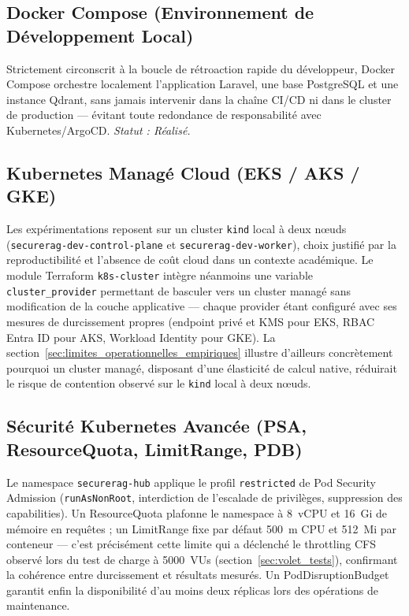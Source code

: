 \subsection{Docker Compose (Environnement de Développement Local)}
Strictement circonscrit à la boucle de rétroaction rapide du développeur, Docker Compose orchestre localement l'application Laravel, une base PostgreSQL et une instance Qdrant, sans jamais intervenir dans la chaîne CI/CD ni dans le cluster de production — évitant toute redondance de responsabilité avec Kubernetes/ArgoCD. \textit{Statut : Réalisé.}

\subsection{Kubernetes Managé Cloud (EKS / AKS / GKE)}
Les expérimentations reposent sur un cluster \texttt{kind} local à deux nœuds (\texttt{securerag-dev-control-plane} et \texttt{securerag-dev-worker}), choix justifié par la reproductibilité et l'absence de coût cloud dans un contexte académique. Le module Terraform \texttt{k8s-cluster} intègre néanmoins une variable \texttt{cluster\_provider} permettant de basculer vers un cluster managé sans modification de la couche applicative — chaque provider étant configuré avec ses mesures de durcissement propres (endpoint privé et KMS pour EKS, RBAC Entra ID pour AKS, Workload Identity pour GKE). La section~\ref{sec:limites_operationnelles_empiriques} illustre d'ailleurs concrètement pourquoi un cluster managé, disposant d'une élasticité de calcul native, réduirait le risque de contention observé sur le \texttt{kind} local à deux nœuds.

\subsection{Sécurité Kubernetes Avancée (PSA, ResourceQuota, LimitRange, PDB)}
Le namespace \texttt{securerag-hub} applique le profil \texttt{restricted} de Pod Security Admission (\texttt{runAsNonRoot}, interdiction de l'escalade de privilèges, suppression des capabilities). Un ResourceQuota plafonne le namespace à 8~vCPU et 16~Gi de mémoire en requêtes ; un LimitRange fixe par défaut 500~m CPU et 512~Mi par conteneur — c'est précisément cette limite qui a déclenché le throttling CFS observé lors du test de charge à 5000~VUs (section~\ref{sec:volet_tests}), confirmant la cohérence entre durcissement et résultats mesurés. Un PodDisruptionBudget garantit enfin la disponibilité d'au moins deux réplicas lors des opérations de maintenance.

